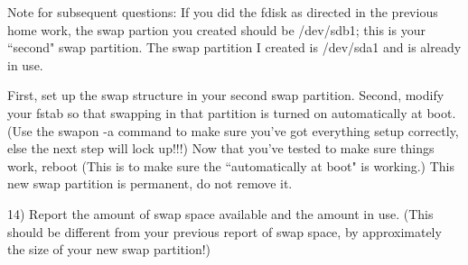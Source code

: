 Note for subsequent questions:
If you did the {\ltt{}fdisk} as directed in the previous home work,
the swap partion you created should be {\ltt{}/dev/sdb1}; this is your
``second" swap partition.
The swap partition I created is {\ltt{}/dev/sda1} and is already in use.

First, set up the swap structure in your second swap partition.
Second, modify your {\ltt{}fstab} so that swapping in that partition
is turned on automatically at boot.
(Use the {\ltt{}swapon -a} command to make sure you've got everything
setup correctly, else the next step will lock up!!!)
Now that you've tested to make sure things work, reboot
(This is to make sure the ``automatically at boot" is working.)
This new swap partition is permanent, do not remove it.

14) Report the amount of swap space available and the amount in use.
(This should be different from your previous report of swap space, by
approximately the size of your new swap partition!)

\bye
